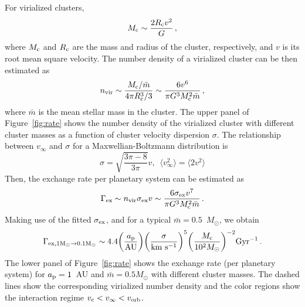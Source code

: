 \documentclass[twocolumn]{aastex62}
\begin{document}
{\color{red}For virialized clusters,
\begin{equation}
M_{\rm c}\sim \frac{2R_{\rm c}v^2}{G}\,,
\end{equation}
where $M_{\rm c}$ and $R_{\rm c}$ are the mass and radius of the cluster, respectively, and $v$ is its root mean square velocity. The number density of a virialized cluster can be then estimated as
\begin{equation}
n_{\rm vir}\sim\frac{M_{\rm c}/\bar{m}}{4\pi R_{\rm c}^3/3}\sim\frac{6v^6}{\pi G^3M_{\rm c}^2\bar{m}}\,,
\end{equation}
where $\bar{m}$ is the mean stellar mass in the cluster. The upper panel of Figure~\ref{fig:rate} shows the number density of the virialized cluster with different cluster masses as a function of cluster velocity dispersion $\sigma$. The relationship between $v_\infty$ and $\sigma$ for a Maxwellian-Boltzmann distribution is
\begin{equation}
\sigma=\sqrt{\frac{3\pi-8}{3\pi}}v,\,\,\,\langle v_\infty^2\rangle =\langle 2v^2 \rangle
\end{equation}
Then, the exchange rate per planetary system can be estimated as
\begin{equation}
\Gamma_{\rm ex} \sim n_{\rm vir}\sigma_{\rm ex} v \sim \frac{6\sigma_{\rm ex}v^7}{\pi G^3M_{\rm c}^2\bar{m}}\,.
\end{equation}
Making use of the fitted $\sigma_{\rm ex}$, and for a typical $\bar{m}=0.5$~$M_\odot$, we  obtain
\begin{equation}
\Gamma_{\rm ex,1M_\odot\rightarrow 0.1M_\odot}\sim 4.4\bigg(\frac{a_{\rm p}}{\rm AU} \bigg)\bigg(\frac{\sigma}{\rm km~s^{-1}}\bigg)^5 \bigg( \frac{M_{\rm c}}{10^2M_\odot}\bigg)^{-2}{\rm Gyr^{-1}}\,.
\end{equation}
The lower panel of Figure~\ref{fig:rate} shows the exchange rate (per planetary system) for $a_{\rm p}=1$~AU and $\bar{m}=0.5 M_\odot$ with different cluster masses. The dashed lines show the corresponding virialized number density and the color regions show the interaction regime $v_{\rm c}<v_\infty<v_{\rm orb}$. 
}
\end{document}
